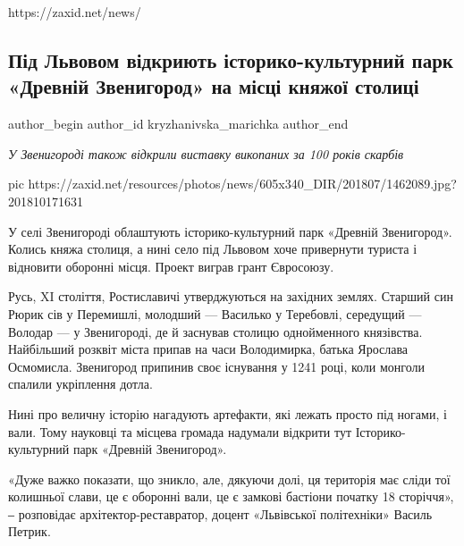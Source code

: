  
 
 
 
https://zaxid.net/news/
 
 
\subsection{Під Львовом відкриють історико-культурний парк «Древній Звенигород» на місці княжої столиці}
\label{sec:23_07_2018.news.ua.zaxid_net.kryzhanivska_marichka.1.zvenygorod}
\ifcmt
	author_begin
   author_id kryzhanivska_marichka
	author_end
\fi

\emph{У Звенигороді також відкрили виставку викопаних за 100 років скарбів}

\ifcmt
pic https://zaxid.net/resources/photos/news/605x340_DIR/201807/1462089.jpg?201810171631
\fi

У селі Звенигороді облаштують історико-культурний парк «Древній Звенигород».
Колись княжа столиця, а нині село під Львовом хоче привернути туриста і
відновити оборонні місця. Проект виграв грант Євросоюзу.

Русь, XI століття, Ростиславичі утверджуються на західних землях. Старший син
Рюрик сів у Перемишлі, молодший — Василько у Теребовлі, середущий — Володар — у
Звенигороді, де й заснував столицю однойменного князівства. Найбільший розквіт
міста припав на часи Володимирка, батька Ярослава Осмомисла. Звенигород
припинив своє існування у 1241 році, коли монголи спалили укріплення дотла.

Нині про величну історію нагадують артефакти, які лежать просто під ногами, і
вали. Тому науковці та місцева громада надумали відкрити тут
Історико-культурний парк «Древній Звенигород».

«Дуже важко показати, що зникло, але, дякуючи долі, ця територія має сліди тої
колишньої слави, це є оборонні вали, це є замкові бастіони початку 18
сторіччя», ‒ розповідає архітектор-реставратор, доцент «Львівської політехніки»
Василь Петрик.

